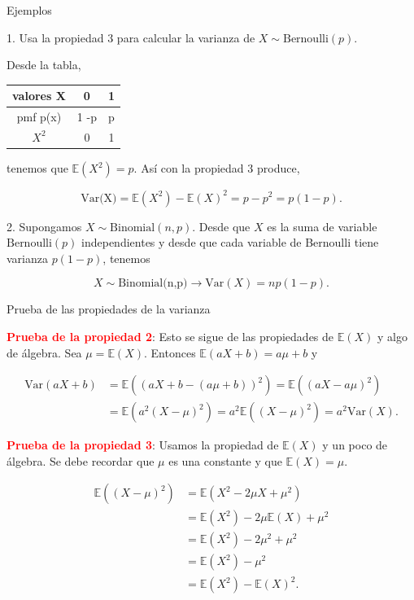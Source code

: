 \documentclass[10pt]{beamer}
\begin{document}
\begin{frame}{Ejemplos}
\small{1. Usa la propiedad 3 para calcular la varianza de $X \sim \text{Bernoulli}(p).$
	
Desde la tabla,

\begin{table}[]
	
	\begin{tabular}{c|cc}
		valores  X & 0    & 1     \\
		\hline
		pmf p(x)   & 1 -p & p \\
		\hline
		$X^2$ & 0 &  1	 
	\end{tabular}
\end{table}

tenemos que $\mathbb{E}(X^2) = p$. As\'i con la propiedad 3 produce,

\[
\text{Var(X)} = \mathbb{E}(X^2) - \mathbb{E}(X)^2 = p - p^2 = p(1 -p).
\]

2. Supongamos $X \sim \text{Binomial}(n,p)$. Desde que $X$  es la suma de variable $\text{Bernoulli}(p)$ independientes y desde que cada variable de Bernoulli tiene varianza $p(1 -p)$, tenemos

\[
X \sim \text{Binomial(n,p)} \rightarrow \text{Var}(X) = np(1 - p).
\]
}
\end{frame}

\begin{frame}{Prueba de las propiedades de la varianza}
\small{ \textcolor{red}{\textbf{Prueba de la propiedad 2}}: Esto se sigue de las propiedades de $\mathbb{E}(X)$ y algo de \'algebra. Sea $\mu = \mathbb{E}(X)$. Entonces $\mathbb{E}(aX + b) = a\mu + b$ y

\begin{align*}
\text{Var}(aX + b) &= \mathbb{E}((aX + b - (a\mu + b))^2) = \mathbb{E}((aX -a\mu)^2) \\
& = \mathbb{E}(a^2(X - \mu)^2) = a^2\mathbb{E}((X - \mu)^2) = a^2\text{Var}(X).
\end{align*}


\textcolor{red}{\textbf{Prueba de la propiedad 3}}: Usamos la propiedad de $\mathbb{E}(X)$ y un poco de \'algebra. Se debe recordar que $\mu$ es una constante y que $\mathbb{E}(X) = \mu$.

\begin{align*}
\mathbb{E}((X - \mu)^2) &= \mathbb{E}(X^2 -2\mu X + \mu^2)\\
						&= \mathbb{E}(X^2) - 2\mu\mathbb{E}(X) + \mu^2 \\
						&= \mathbb{E}(X^2) - 2\mu^2 + \mu^2 \\
						&= \mathbb{E}(X^2) -\mu^2 \\
						&= \mathbb{E}(X^2) - \mathbb{E}(X)^2.
\end{align*}
}
\end{frame}
\end{document}
